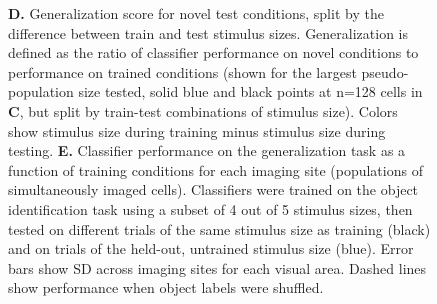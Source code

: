 \begin{figure}[t!]
{    \textbf{D.} Generalization score for novel test conditions, split by the difference between train and test stimulus sizes. Generalization is defined as the ratio of classifier performance on novel conditions to performance on trained conditions (shown for the largest pseudo-population size tested, solid blue and black points at n=128 cells in \textbf{C}, but split by train-test combinations of stimulus size). Colors show stimulus size during training minus stimulus size during testing.
    \textbf{E.} Classifier performance on the generalization task as a function of training conditions for each imaging site (populations of simultaneously imaged cells). Classifiers were trained on the object identification task using a subset of 4 out of 5 stimulus sizes, then tested on different trials of the same stimulus size as training (black) and on trials of the held-out, untrained stimulus size (blue). Error bars show SD across imaging sites for each visual area. Dashed lines show performance when object labels were shuffled. 
    \label{fig:neural_generalization}}
\end{figure}



